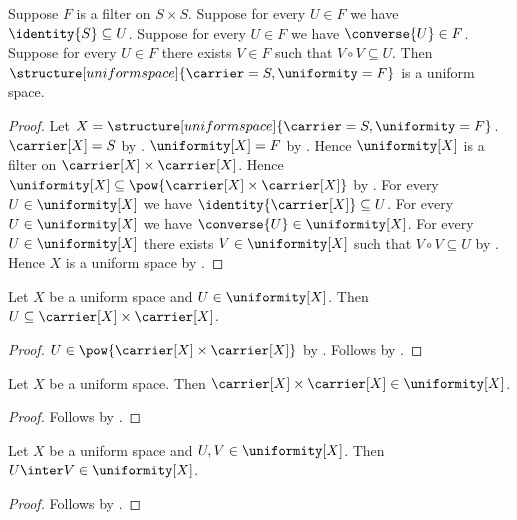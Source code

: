 \begin{theorem}\label{uniform_space_from_filter}
    Suppose $F$ is a filter on $S\times S$.
    Suppose for every $U\in F$ we have $\identity{S}\subseteq U$.
    Suppose for every $U\in F$ we have $\converse{U}\in F$.
    Suppose for every $U\in F$ there exists $V\in F$ such that
        $V\circ V\subseteq U$.
    Then
        $\structure[uniform space]{
            \carrier=S,
            \uniformity=F
        }$
        is a uniform space.
\end{theorem}
\begin{proof}
    Let $X=
        \structure[uniform space]{
            \carrier=S,
            \uniformity=F
        }$.
    $\carrier[X]=S$ by
        .
    $\uniformity[X]=F$ by
        .
    Hence $\uniformity[X]$ is a filter on
        $\carrier[X]\times\carrier[X]$.
    Hence $\uniformity[X]\subseteq
        \pow{\carrier[X]\times\carrier[X]}$
        by .
    For every $U\in\uniformity[X]$ we have
        $\identity{\carrier[X]}\subseteq U$.
    For every $U\in\uniformity[X]$ we have
        $\converse{U}\in\uniformity[X]$.
    For every $U\in\uniformity[X]$ there exists
        $V\in\uniformity[X]$ such that $V\circ V\subseteq U$
        by \auto.
    Hence $X$ is a uniform space by
        .
\end{proof}

\begin{proposition}\label{uniform_entourage_type}
    Let $X$ be a uniform space and $U\in\uniformity[X]$.
    Then $U\subseteq\carrier[X]\times\carrier[X]$.
\end{proposition}
\begin{proof}
    $U\in\pow{\carrier[X]\times\carrier[X]}$
        by .
    Follows by .
\end{proof}

\begin{proposition}\label{uniform_top_entourage}
    Let $X$ be a uniform space.
    Then $\carrier[X]\times\carrier[X]\in\uniformity[X]$.
\end{proposition}
\begin{proof}
    Follows by .
\end{proof}

\begin{proposition}\label{uniform_entourage_intersection}
    Let $X$ be a uniform space and $U,V\in\uniformity[X]$.
    Then $U\inter V\in\uniformity[X]$.
\end{proposition}
\begin{proof}
    Follows by .
\end{proof}

